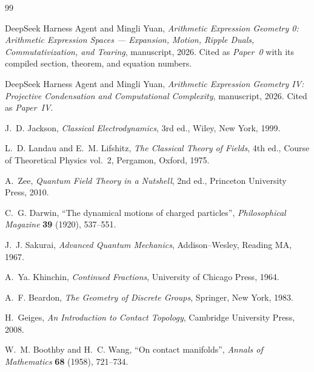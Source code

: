 \documentclass[11pt]{article}
\theoremstyle{definition}
\theoremstyle{remark}
\begin{document}
\begin{thebibliography}{99}\small

DeepSeek Harness Agent and Mingli Yuan,
\emph{Arithmetic Expression Geometry 0: Arithmetic Expression Spaces ---
Expansion, Motion, Ripple Duals, Commutativization, and Tearing},
manuscript, 2026.  Cited as \emph{Paper~0} with its compiled section, theorem,
and equation numbers.

DeepSeek Harness Agent and Mingli Yuan,
\emph{Arithmetic Expression Geometry IV: Projective Condensation and
Computational Complexity}, manuscript, 2026.  Cited as \emph{Paper~IV}.

J.~D. Jackson, \emph{Classical Electrodynamics}, 3rd ed.,
Wiley, New York, 1999.

L.~D. Landau and E.~M. Lifshitz, \emph{The Classical Theory of Fields},
4th ed., Course of Theoretical Physics vol.~2, Pergamon, Oxford, 1975.

A.~Zee, \emph{Quantum Field Theory in a Nutshell}, 2nd ed.,
Princeton University Press, 2010.

C.~G. Darwin, ``The dynamical motions of charged particles'',
\emph{Philosophical Magazine} \textbf{39} (1920), 537--551.

J.~J. Sakurai, \emph{Advanced Quantum Mechanics},
Addison--Wesley, Reading MA, 1967.

A.~Ya. Khinchin, \emph{Continued Fractions},
University of Chicago Press, 1964.

A.~F. Beardon, \emph{The Geometry of Discrete Groups},
Springer, New York, 1983.

H.~Geiges, \emph{An Introduction to Contact Topology},
Cambridge University Press, 2008.

W.~M. Boothby and H.~C. Wang, ``On contact manifolds'',
\emph{Annals of Mathematics} \textbf{68} (1958), 721--734.

\end{thebibliography}
\end{document}
